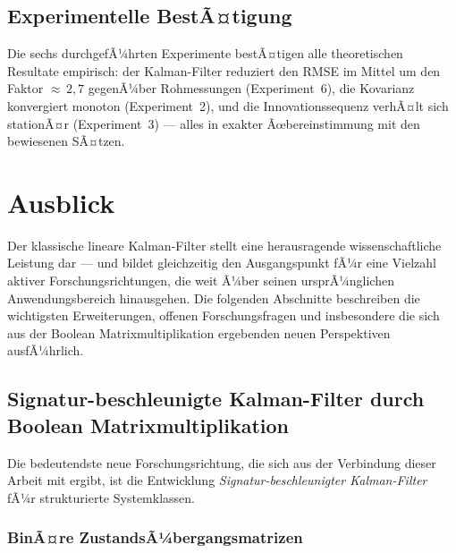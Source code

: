 ﻿\documentclass[a4paper,12pt]{article}
\theoremstyle{definition}
\begin{document}
\subsection{Experimentelle BestÃ¤tigung}

Die sechs durchgefÃ¼hrten Experimente bestÃ¤tigen alle theoretischen Resultate empirisch:
der Kalman-Filter reduziert den RMSE im Mittel um den Faktor ${\approx}\,2{,}7$
gegenÃ¼ber Rohmessungen (Experiment~6), die Kovarianz konvergiert monoton
(Experiment~2), und die Innovationssequenz verhÃ¤lt sich stationÃ¤r (Experiment~3) ---
alles in exakter Ãœbereinstimmung mit den bewiesenen SÃ¤tzen.

\section{Ausblick}

Der klassische lineare Kalman-Filter stellt eine herausragende wissenschaftliche
Leistung dar --- und bildet gleichzeitig den Ausgangspunkt fÃ¼r eine Vielzahl
aktiver Forschungsrichtungen, die weit Ã¼ber seinen ursprÃ¼nglichen Anwendungsbereich
hinausgehen. Die folgenden Abschnitte beschreiben die wichtigsten Erweiterungen,
offenen Forschungsfragen und insbesondere die sich aus der Boolean Matrixmultiplikation
\cite{epp2026boolmm} ergebenden neuen Perspektiven ausfÃ¼hrlich.

\subsection{Signatur-beschleunigte Kalman-Filter durch Boolean Matrixmultiplikation}

Die bedeutendste neue Forschungsrichtung, die sich aus der Verbindung dieser Arbeit
mit \cite{epp2026boolmm} ergibt, ist die Entwicklung \emph{Signatur-beschleunigter
Kalman-Filter} fÃ¼r strukturierte Systemklassen.

\subsubsection{BinÃ¤re ZustandsÃ¼bergangsmatrizen}
\end{document}
